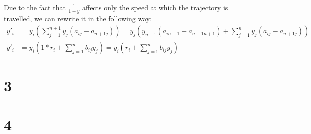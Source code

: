 Due to the fact that $\frac{1}{1+y}$ affects only the speed at which the trajectory is travelled, we can rewrite it in the following way:
\begin{align*} 
y'_i &= y_i \left( \sum\limits_{j=1}^{n+1} y_j(a_{ij}-a_{n+1j}) \right) = y_j \left( y_{n+1}(a_{in+1}-a_{n+1n+1}) + \sum\limits_{j=1}^{n} y_j(a_{ij}-a_{n+1j})\right)\\
y'_i &= y_i(1*r_i + \sum\limits_{j=1}^{n} b_{ij}y_{j}) = y_i\left(r_i+\sum\limits_{j=1}^{n} b_{ij}y_j \right)
\end{align*}

\setcounter{chapter}{3}
\setcounter{section}{0}
\section{3}
\setcounter{chapter}{4}
\setcounter{section}{0}
\section{4}

